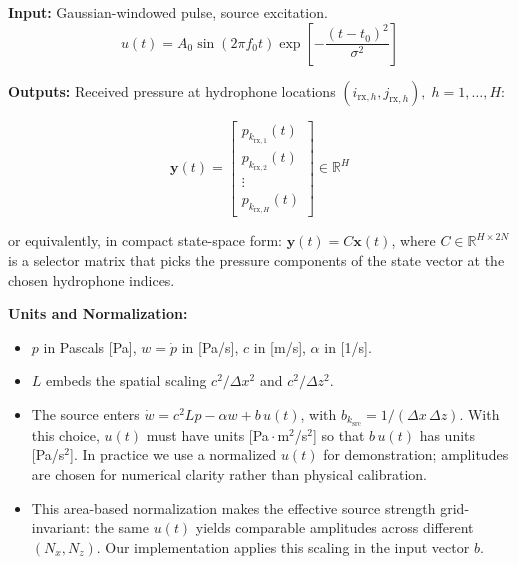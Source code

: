 \documentclass[11pt]{article}
\begin{document}
\textbf{Input:} Gaussian-windowed pulse, source excitation.
\[
u(t) = A_0 \sin(2\pi f_0 t) \exp\!\left[-\frac{(t-t_0)^2}{\sigma^2}\right]
\]

\textbf{Outputs:} Received pressure at hydrophone locations $(i_{\mathrm{rx},h},j_{\mathrm{rx},h}), \; h=1,\dots,H$:

\[
\mathbf{y}(t) = 
\begin{bmatrix}
p_{k_{\mathrm{rx},1}}(t) \\
p_{k_{\mathrm{rx},2}}(t) \\
\vdots \\
p_{k_{\mathrm{rx},H}}(t)
\end{bmatrix}
\in \mathbb{R}^{H}
\]

or equivalently, in compact state-space form: $\mathbf{y}(t) = C \mathbf{x}(t)$, where $C \in \mathbb{R}^{H \times 2N}$ is a selector matrix that picks the pressure components of the state vector at the chosen hydrophone indices.

\textbf{Units and Normalization:}
\begin{itemize}
    \item $p$ in Pascals [Pa], $w=\dot p$ in [Pa/s], $c$ in [m/s], $\alpha$ in [1/s].
    \item $L$ embeds the spatial scaling $c^2/\Delta x^2$ and $c^2/\Delta z^2$.
    \item The source enters $\dot w = c^2 L p - \alpha w + b\,u(t)$, with $b_{k_\mathrm{src}} = 1/(\Delta x\,\Delta z)$. With this choice, $u(t)$ must have units [Pa\,$\cdot$\,m$^2$/s$^2$] so that $b\,u(t)$ has units [Pa/s$^2$]. In practice we use a normalized $u(t)$ for demonstration; amplitudes are chosen for numerical clarity rather than physical calibration.
    \item This area-based normalization makes the effective source strength grid-invariant: the same $u(t)$ yields comparable amplitudes across different $(N_x,N_z)$. Our implementation applies this scaling in the input vector $b$.
\end{itemize}

\newpage
\end{document}
